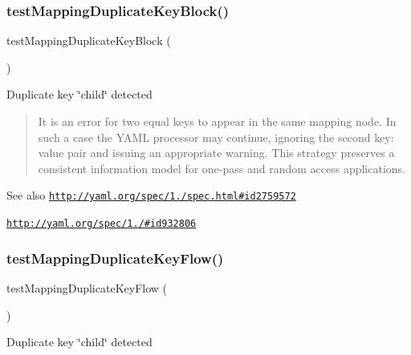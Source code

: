 \subsubsection{\texorpdfstring{test\+Mapping\+Duplicate\+Key\+Block()}{testMappingDuplicateKeyBlock()}}
{\footnotesize\ttfamily test\+Mapping\+Duplicate\+Key\+Block (\begin{DoxyParamCaption}{ }\end{DoxyParamCaption})}

Duplicate key \char`\"{}child\char`\"{} detected

\begin{quote}
It is an error for two equal keys to appear in the same mapping node. In such a case the Y\+A\+ML processor may continue, ignoring the second {\ttfamily key\+: value} pair and issuing an appropriate warning. This strategy preserves a consistent information model for one-\/pass and random access applications. \end{quote}


\begin{DoxySeeAlso}{See also}
\href{http://yaml.org/spec/1.2/spec.html#id2759572}{\tt http\+://yaml.\+org/spec/1./spec.\+html\#id2759572} 

\href{http://yaml.org/spec/1.1/#id932806}{\tt http\+://yaml.\+org/spec/1./\#id932806} 
\end{DoxySeeAlso}
\mbox{\label{class_symfony_1_1_component_1_1_yaml_1_1_tests_1_1_parser_test_aa71fb50154fd6d770e8322ca6ba49447}} 
\subsubsection{\texorpdfstring{test\+Mapping\+Duplicate\+Key\+Flow()}{testMappingDuplicateKeyFlow()}}
{\footnotesize\ttfamily test\+Mapping\+Duplicate\+Key\+Flow (\begin{DoxyParamCaption}{ }\end{DoxyParamCaption})}

Duplicate key \char`\"{}child\char`\"{} detected \mbox{\label{class_symfony_1_1_component_1_1_yaml_1_1_tests_1_1_parser_test_a9aa015561d9c9407cab43f6be94536e1}} 
